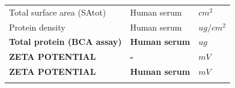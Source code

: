 \documentclass[utf8]{frontiersHLTH} %
\begin{document}
\begin{longtable}[]{@{}lll@{}}
\begin{minipage}[t]{0.58\columnwidth}
Total surface area (SAtot)\strut
\end{minipage} & \begin{minipage}[t]{0.20\columnwidth}\raggedright\strut
Human serum\strut
\end{minipage} & \begin{minipage}[t]{0.13\columnwidth}\raggedright\strut
\(cm^2\)\strut
\end{minipage}\tabularnewline
\begin{minipage}[t]{0.58\columnwidth}\raggedright\strut
Protein density\strut
\end{minipage} & \begin{minipage}[t]{0.20\columnwidth}\raggedright\strut
Human serum\strut
\end{minipage} & \begin{minipage}[t]{0.13\columnwidth}\raggedright\strut
\(ug/cm^2\)\strut
\end{minipage}\tabularnewline
\begin{minipage}[t]{0.58\columnwidth}\raggedright\strut
\textbf{Total protein (BCA assay)}\strut
\end{minipage} & \begin{minipage}[t]{0.20\columnwidth}\raggedright\strut
\textbf{Human serum}\strut
\end{minipage} & \begin{minipage}[t]{0.13\columnwidth}\raggedright\strut
\(ug\)\strut
\end{minipage}\tabularnewline
\begin{minipage}[t]{0.58\columnwidth}\raggedright\strut
\textbf{ZETA POTENTIAL}\strut
\end{minipage} & \begin{minipage}[t]{0.20\columnwidth}\raggedright\strut
\textbf{-}\strut
\end{minipage} & \begin{minipage}[t]{0.13\columnwidth}\raggedright\strut
\(mV\)\strut
\end{minipage}\tabularnewline
\begin{minipage}[t]{0.58\columnwidth}\raggedright\strut
\textbf{ZETA POTENTIAL}\strut
\end{minipage} & \begin{minipage}[t]{0.20\columnwidth}\raggedright\strut
\textbf{Human serum}\strut
\end{minipage} & \begin{minipage}[t]{0.13\columnwidth}\raggedright\strut
\(mV\)\strut
\end{minipage}\tabularnewline
\begin{minipage}[t]{0.58\columnwidth}\raggedright\strut

\end{minipage}
\end{longtable}
\end{document}
